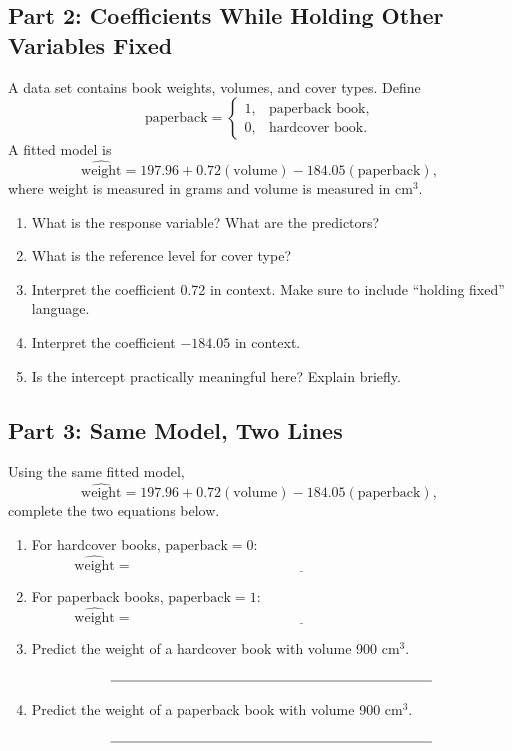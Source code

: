 \documentclass{article}
\newcommand{\blankline}[1]{\underline{\hspace{#1}}}
\begin{document}
\subsection*{Part 2: Coefficients While Holding Other Variables Fixed}
A data set contains book weights, volumes, and cover types. Define
\[
\text{paperback}=\begin{cases}
1, & \text{paperback book},\\
0, & \text{hardcover book}.
\end{cases}
\]
A fitted model is
\[
\widehat{\text{weight}} = 197.96 + 0.72(\text{volume}) - 184.05(\text{paperback}),
\]
where weight is measured in grams and volume is measured in cm$^3$.

\begin{enumerate}[label={\bfseries (\Alph*)},itemsep=.8em]
\item What is the response variable? What are the predictors? \\[3em]
\item What is the reference level for cover type? \\[2.5em]
\item Interpret the coefficient 0.72 in context. Make sure to include ``holding fixed'' language. \\[4em]
\item Interpret the coefficient $-184.05$ in context. \\[4em]
\item Is the intercept practically meaningful here? Explain briefly. \\[3em]
\end{enumerate}

\subsection*{Part 3: Same Model, Two Lines}
Using the same fitted model,
\[
\widehat{\text{weight}} = 197.96 + 0.72(\text{volume}) - 184.05(\text{paperback}),
\]
complete the two equations below.

\begin{enumerate}[label={\bfseries (\Alph*)},itemsep=.8em]
\item For hardcover books, $\text{paperback}=0$:
\[
\widehat{\text{weight}} = \blankline{4in}
\]
\item For paperback books, $\text{paperback}=1$:
\[
\widehat{\text{weight}} = \blankline{4in}
\]
\item Predict the weight of a hardcover book with volume 900 cm$^3$.
\[
\blankline{3.2in}
\]
\item Predict the weight of a paperback book with volume 900 cm$^3$.
\[
\blankline{3.2in}
\]
\end{enumerate}
\end{document}
